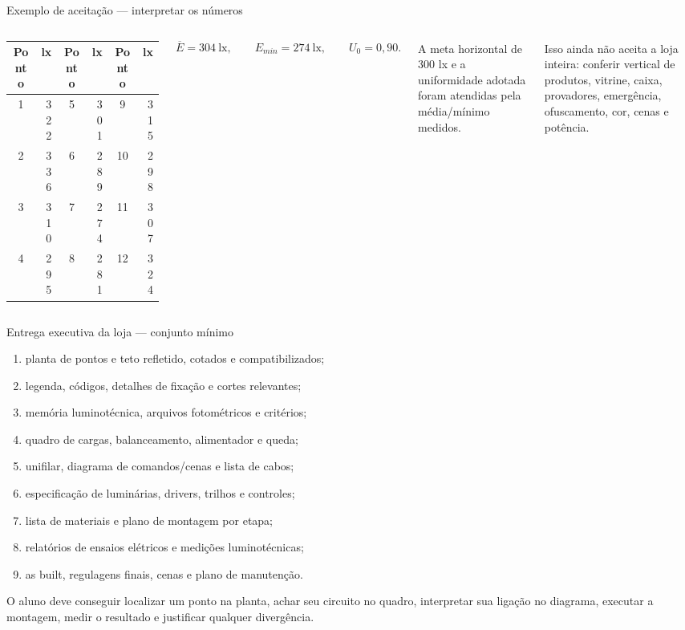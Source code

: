 \begin{frame}{Exemplo de aceitação — interpretar os números}
\small
\begin{columns}[T,onlytextwidth]
\begin{tabular}{c r@{\quad}c r@{\quad}c r}
\toprule
Ponto & lx & Ponto & lx & Ponto & lx \\
\midrule
1 & 322 & 5 & 301 & 9 & 315 \\
2 & 336 & 6 & 289 & 10 & 298 \\
3 & 310 & 7 & 274 & 11 & 307 \\
4 & 295 & 8 & 281 & 12 & 324 \\
\bottomrule
\end{tabular}
\[
\overline{E}=304\ \mathrm{lx},\qquad E_{min}=274\ \mathrm{lx},\qquad U_0=0{,}90.
\]
\begin{caixaEx}[title=Conclusão do exemplo]
A meta horizontal de 300 lx e a uniformidade adotada foram atendidas pela média/mínimo medidos.
\end{caixaEx}
\begin{caixaAt}
Isso ainda não aceita a loja inteira: conferir vertical de produtos, vitrine, caixa, provadores, emergência, ofuscamento, cor, cenas e potência.
\end{caixaAt}
\end{columns}
\end{frame}

\begin{frame}{Entrega executiva da loja — conjunto mínimo}
\small
\begin{enumerate}
\item planta de pontos e teto refletido, cotados e compatibilizados;
\item legenda, códigos, detalhes de fixação e cortes relevantes;
\item memória luminotécnica, arquivos fotométricos e critérios;
\item quadro de cargas, balanceamento, alimentador e queda;
\item unifilar, diagrama de comandos/cenas e lista de cabos;
\item especificação de luminárias, drivers, trilhos e controles;
\item lista de materiais e plano de montagem por etapa;
\item relatórios de ensaios elétricos e medições luminotécnicas;
\item as built, regulagens finais, cenas e plano de manutenção.
\end{enumerate}
\begin{caixaProjeto}[title=Competência avaliada]
O aluno deve conseguir localizar um ponto na planta, achar seu circuito no quadro, interpretar sua ligação no diagrama, executar a montagem, medir o resultado e justificar qualquer divergência.
\end{caixaProjeto}
\end{frame}

